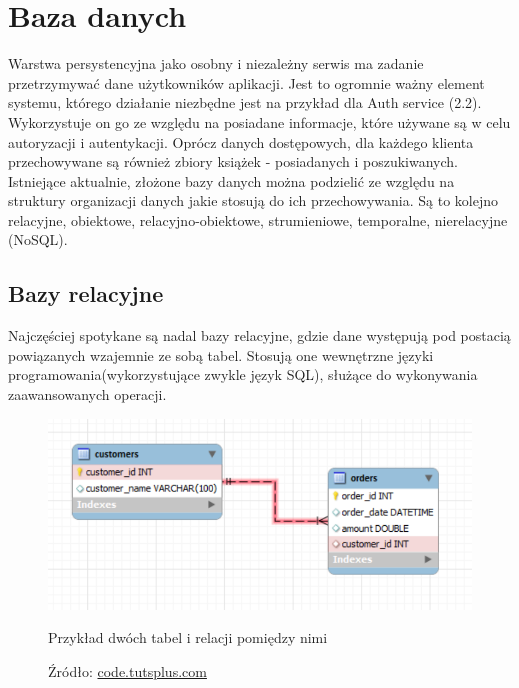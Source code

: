 \section{Baza danych}
Warstwa persystencyjna jako osobny i niezależny serwis ma zadanie przetrzymywać dane użytkowników aplikacji. Jest to ogromnie ważny element systemu, którego działanie niezbędne jest na przykład dla Auth service (2.2). Wykorzystuje on go ze względu na posiadane informacje, które używane są w celu autoryzacji i autentykacji.
Oprócz danych dostępowych, dla każdego klienta przechowywane są również zbiory książek - posiadanych i poszukiwanych.\newline
Istniejące aktualnie, złożone bazy danych można podzielić ze względu na struktury organizacji danych jakie stosują do ich przechowywania. Są to kolejno relacyjne, obiektowe, relacyjno-obiektowe, strumieniowe, temporalne, nierelacyjne (NoSQL).

\subsection{Bazy relacyjne}
Najczęściej spotykane są nadal bazy relacyjne, gdzie dane występują pod postacią powiązanych wzajemnie ze sobą tabel. Stosują one wewnętrzne języki programowania(wykorzystujące zwykle język SQL), służące do wykonywania zaawansowanych operacji.
\begin{figure}[H]
	\centering
	\includegraphics[width=\linewidth]{relations.pdf}
	\caption{\centering Przykład dwóch tabel i relacji pomiędzy nimi}
	\caption*{\centering Źródło: \url{code.tutsplus.com}}
\end{figure}

